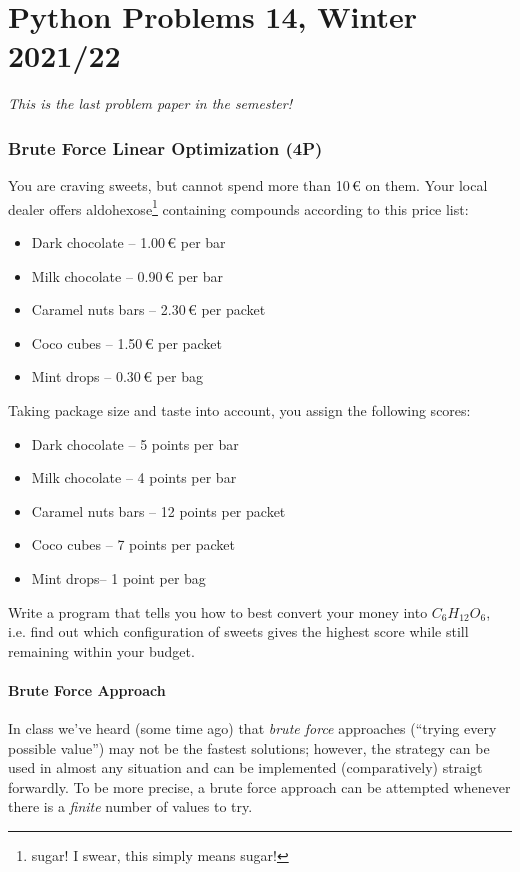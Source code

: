 \documentclass[
	english,
	fontsize=10pt,
	parskip=half,
	titlepage=true,
	DIV=12
]{scrartcl}
\newcommand*{\ie}{i.\;e. }
\begin{document}
\part*{Python Problems 14, Winter 2021/22}

\begin{center}
	\Large
	\emph{This is the last problem paper in the semester!}
\end{center}

\section*{Brute Force Linear Optimization (4\;P)}
You are craving sweets, but cannot spend more than 10\,€ on them. Your local dealer offers aldohexose\footnote{sugar! I swear, this simply means sugar!} containing compounds according to this price list:
\begin{itemize}
\item Dark chocolate -- 1.00\,€ per bar
\item Milk chocolate -- 0.90\,€ per bar
\item Caramel nuts bars -- 2.30\,€ per packet
\item Coco cubes -- 1.50\,€ per packet
\item Mint drops -- 0.30\,€ per bag
\end{itemize}

Taking package size and taste into account, you assign the following scores:
\begin{itemize}
\item Dark chocolate -- 5 points per bar
\item Milk chocolate -- 4 points per bar
\item Caramel nuts bars -- 12 points per packet
\item Coco cubes -- 7 points per packet
\item Mint drops-- 1 point per bag
\end{itemize}

Write a program that tells you how to best convert  your money into $C_6H_{12}O_6$, \ie find out which configuration of sweets gives the highest score while still remaining within your budget.

\subsection*{Brute Force Approach}
In class we've heard (some time ago) that \emph{brute force} approaches (\enquote{trying every possible value}) may not be the fastest solutions; however, the strategy can be used in almost any situation and can be implemented (comparatively) straigt forwardly. To be more precise, a brute force approach can be attempted whenever there is a \emph{finite} number of values to try.
\end{document}

